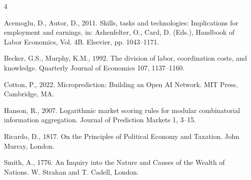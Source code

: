 \documentclass[preprint,11pt,authoryear]{elsarticle}
\begin{document}
\small
\begin{thebibliography}{4}
\providecommand{\natexlab}[1]{#1}

Acemoglu, D., Autor, D., 2011. Skills, tasks and technologies: Implications for
employment and earnings, in: Ashenfelter, O., Card, D. (Eds.), Handbook of
Labor Economics, Vol. 4B. Elsevier, pp. 1043--1171.

Becker, G.S., Murphy, K.M., 1992. The division of labor, coordination costs,
and knowledge. Quarterly Journal of Economics 107, 1137--1160.

Cotton, P., 2022. Microprediction: Building an Open AI Network. MIT Press,
Cambridge, MA.

Hanson, R., 2007. Logarithmic market scoring rules for modular combinatorial
information aggregation. Journal of Prediction Markets 1, 3--15.

Ricardo, D., 1817. On the Principles of Political Economy and Taxation.
John Murray, London.

Smith, A., 1776. An Inquiry into the Nature and Causes of the Wealth of
Nations. W. Strahan and T. Cadell, London.

\end{thebibliography}
\end{document}
